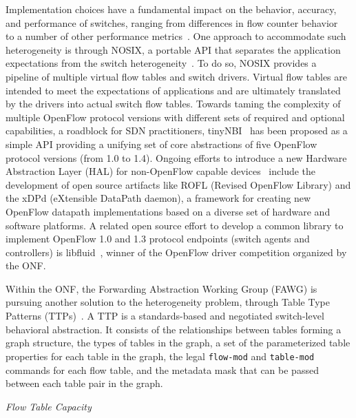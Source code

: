 Implementation choices have a fundamental impact on the behavior, accuracy, and performance of switches, 
ranging from differences in flow counter behavior~\cite{curtis2011} to a number of 
other performance metrics~\cite{rotsos2012-1}. One approach to accommodate such heterogeneity 
is through NOSIX, a portable API that separates the application expectations from the switch heterogeneity~\cite{wundsam2012}. To do so, NOSIX provides a pipeline of multiple virtual flow 
tables and switch drivers. Virtual flow tables are intended to meet the expectations of applications and 
are ultimately translated by the drivers into actual switch flow tables. 
Towards taming the  complexity of multiple OpenFlow protocol versions with different sets of required and optional capabilities, a roadblock for SDN practitioners, tinyNBI~\cite{casey2014} has been proposed as a  simple API providing a unifying set of core abstractions of five OpenFlow protocol versions (from 1.0 to 1.4).
Ongoing efforts to introduce a new Hardware Abstraction Layer  (HAL) for non-OpenFlow capable devices~\cite{alienfp7}  include the development of open source artifacts like ROFL (Revised OpenFlow Library) and the xDPd (eXtensible DataPath daemon), a framework for creating new OpenFlow datapath implementations based on a diverse set of hardware and software platforms.
A related open source effort to develop a common library to implement OpenFlow 1.0 and 1.3 protocol endpoints (switch agents and controllers) is libfluid~\cite{libfluid}, winner of the OpenFlow driver competition organized by the ONF.

Within the ONF, the Forwarding Abstraction Working Group (FAWG) is pursuing another solution to the heterogeneity problem, through Table Type Patterns 
(TTPs)~\cite{onf2013}. A TTP is a standards-based and negotiated switch-level behavioral abstraction. 
It consists of the relationships between tables forming a graph structure, the types of tables in the graph, 
a set of the parameterized table properties for each table in the graph, the legal \texttt{flow-mod} and \texttt{table-mod} commands for 
each flow table, and the metadata mask that can be passed between each table pair in the graph. 


\vspace{2mm}
\noindent \textit{Flow Table Capacity}

